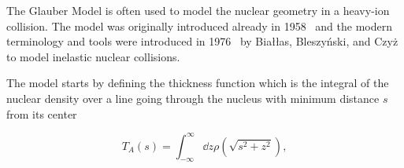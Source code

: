 



The Glauber Model is often used to model the nuclear geometry in a heavy-ion collision. The model was originally introduced already in 1958~\cite{Glauber:1959} and the modern terminology and tools were introduced in 1976~\cite{Biallas1976461} by Białłas, Bleszyński, and Czyż to model inelastic nuclear collisions.

The model starts by defining the thickness function which is the integral of the nuclear density over a line going through the nucleus with minimum distance $s$ from its center

\begin{equation}
T_A\left(s\right)=\int_{-\infty}^{\infty}\dd z \rho\left(\sqrt{s^2+z^2}\right),
\end{equation}

